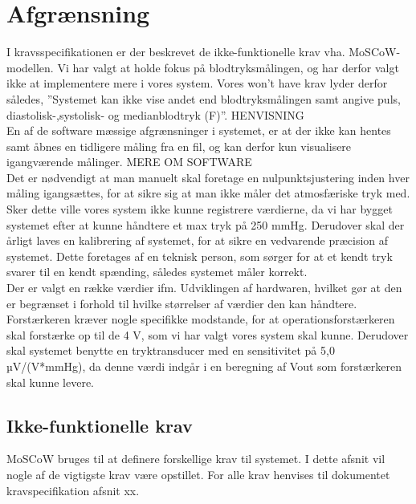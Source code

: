 \section{Afgrænsning}
I kravsspecifikationen er der beskrevet de ikke-funktionelle krav vha. MoSCoW- modellen. Vi har valgt at holde fokus på blodtryksmålingen, og har derfor valgt ikke at implementere mere i vores system. Vores won’t have krav lyder derfor således,
”Systemet kan ikke vise andet end blodtryksmålingen samt angive puls, diastolisk-,systolisk- og medianblodtryk (F)”. HENVISNING\\

En af de software mæssige afgrænsninger i systemet, er at der ikke kan hentes samt åbnes en tidligere måling fra en fil, og kan derfor kun visualisere igangværende målinger. MERE OM SOFTWARE\\

Det er nødvendigt at man manuelt skal foretage en nulpunktsjustering inden hver måling igangsættes, for at sikre sig at man ikke måler det atmosfæriske tryk med. Sker dette ville vores system ikke kunne registrere værdierne, da vi har bygget systemet efter at kunne håndtere et max tryk på 250 mmHg. Derudover skal der årligt laves en kalibrering af systemet, for at sikre en vedvarende præcision af systemet. Dette foretages af en teknisk person, som sørger for at et kendt tryk svarer til en kendt spænding, således systemet måler korrekt.\\

Der er valgt en række værdier ifm. Udviklingen af hardwaren, hvilket gør at den er begrænset i forhold til hvilke størrelser af værdier den kan håndtere. Forstærkeren kræver nogle specifikke modstande, for at operationsforstærkeren skal forstærke op til de 4 V, som vi har valgt vores system skal kunne. Derudover skal systemet benytte en tryktransducer med en sensitivitet på 5,0 µV/(V*mmHg), da denne værdi indgår i en beregning af Vout som forstærkeren skal kunne levere.

\subsection{Ikke-funktionelle krav}
\vspace{0.3 cm}
MoSCoW bruges til at definere forskellige krav til systemet. I dette afsnit vil nogle af de vigtigste krav være opstillet. For alle krav henvises til dokumentet kravspecifikation afsnit xx. 

